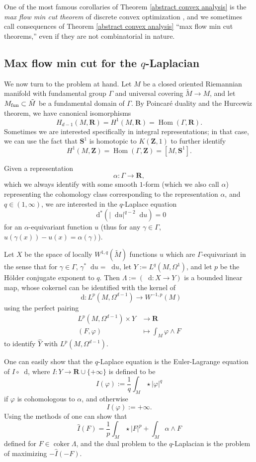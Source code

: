 \documentclass[reqno,11pt]{amsart}
\newcommand{\ZZ}{\mathbf{Z}}
\newcommand{\RR}{\mathbf{R}}
\newcommand{\Sph}{\mathbf S}
\newcommand*\dif{\mathop{}\!\mathrm{d}}
\DeclareMathOperator{\Hom}{Hom}
\DeclareMathOperator{\coker}{coker}
\newcommand{\dfn}[1]{\emph{#1}\index{#1}}
\theoremstyle{definition}
\numberwithin{equation}{section}
\begin{document}
One of the most famous corollaries of Theorem \ref{abstract convex analysis} is the \dfn{max flow min cut theorem} of discrete convex optimization \cite[Chapter 7]{umesh2006algorithms}, and we sometimes call consequences of Theorem \ref{abstract convex analysis} ``max flow min cut theorems,'' even if they are not combinatorial in nature.


\subsection{Max flow min cut for the \texorpdfstring{$q$-Laplacian}{q-Laplacian}}
We now turn to the problem at hand.
Let $M$ be a closed oriented Riemannian manifold with fundamental group $\Gamma$ and universal covering $\tilde M \to M$, and let $M_{\rm fun} \subset \tilde M$ be a fundamental domain of $\Gamma$.
By Poincar\'e duality and the Hurcewiz theorem, we have canonical isomorphisms
$$H_{d - 1}(M, \RR) = H^1(M, \RR) = \Hom(\Gamma, \RR).$$
Sometimes we are interested specifically in integral representations; in that case, we can use the fact that $\Sph^1$ is homotopic to $K(\ZZ, 1)$ to further identify 
$$H^1(M, \ZZ) = \Hom(\Gamma, \ZZ) = [M, \Sph^1].$$

Given a representation
$$\alpha: \Gamma \to \RR,$$
which we always identify with some smooth $1$-form (which we also call $\alpha$) representing the cohomology class corresponding to the representation $\alpha$, and $q \in (1, \infty)$,
we are interested in the $q$-Laplace equation
$$\dif^* (|\dif u|^{q - 2} \dif u) = 0$$
for an $\alpha$-equivariant function $u$ (thus for any $\gamma \in \Gamma$, $u(\gamma(x)) - u(x) = \alpha(\gamma)$).

Let $X$ be the space of locally $W^{1, q}(\tilde M)$ functions $u$ which are $\Gamma$-equivariant in the sense that for $\gamma \in \Gamma$, $\gamma^* \dif u = \dif u$, let $Y := L^q(M, \Omega^1)$, and let $p$ be the H\"older conjugate exponent to $q$.
Then $\Lambda := (\dif: X \to Y)$ is a bounded linear map, whose cokernel can be identified with the kernel of
$$\dif: L^p(M, \Omega^{d - 1}) \to W^{-1, p}(M)$$
using the perfect pairing 
\begin{align*}
	L^p(M, \Omega^{d - 1}) \times Y &\to \RR \\
	(F, \varphi) &\mapsto \int_M \varphi \wedge F 
\end{align*}
to identify $\hat Y$ with $L^p(M, \Omega^{d - 1})$.

One can easily show that the $q$-Laplace equation is the Euler-Lagrange equation of $I \circ \dif$, where $I: Y \to \RR \cup \{+\infty\}$ is defined to be 
$$I(\varphi) := \frac{1}{q} \int_M \star |\varphi|^q$$
if $\varphi$ is cohomologous to $\alpha$, and otherwise 
$$I(\varphi) := +\infty.$$
Using the methods of \cite[Chapter I, \S4]{Ekeland99} one can show that
$$\hat I(F) = \frac{1}{p} \int_M \star |F|^p + \int_M \alpha \wedge F$$
defined for $F \in \coker \Lambda$, and the dual problem to the $q$-Laplacian is the problem of maximizing $-\hat I(-F)$.
\end{document}
